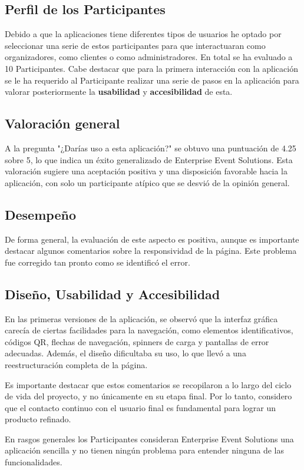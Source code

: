 \subsection{Perfil de los Participantes}
Debido a que la aplicaciones tiene diferentes tipos de usuarios he optado por seleccionar una serie de estos participantes para que interactuaran como organizadores,
como clientes o como administradores. En total se ha evaluado a 10 Participantes.
Cabe destacar que para la primera interacción con la aplicación se le ha requerido al Participante realizar una serie de pasos en la aplicación para 
valorar posteriormente la \textbf{usabilidad} y \textbf{accesibilidad} de esta.

\subsection{Valoración general}
A la pregunta "¿Darías uso a esta aplicación?" se obtuvo una puntuación de 4.25 sobre 5, lo que indica un éxito generalizado de Enterprise Event Solutions.
Esta valoración sugiere una aceptación positiva y una disposición favorable hacia la aplicación, con solo un participante atípico que se desvió de la opinión
general.

\subsection{Desempeño}

De forma general, la evaluación de este aspecto es positiva, aunque es importante destacar algunos comentarios sobre la responsividad de la página. Este problema
fue corregido tan pronto como se identificó el error.

\subsection{Diseño, Usabilidad y Accesibilidad}
En las primeras versiones de la aplicación, se observó que la interfaz gráfica carecía de ciertas facilidades para la navegación, como elementos
identificativos, códigos QR, flechas de navegación, spinners de carga y pantallas de error adecuadas. Además, el diseño dificultaba su uso, lo que llevó a una reestructuración completa de la página.

Es importante destacar que estos comentarios se recopilaron a lo largo del ciclo de vida del proyecto, y no únicamente en su etapa final.
Por lo tanto, considero que el contacto continuo con el usuario final es fundamental para lograr un producto refinado.


En rasgos generales los Participantes consideran Enterprise Event Solutions una aplicación sencilla y no tienen ningún problema para entender ninguna de las
funcionalidades.
